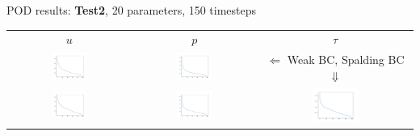 \documentclass[9pt,compress,t,aspectratio=169]{beamer}
\newcommand{\1}{\begin{pmatrix}
		1\\
		1
\end{pmatrix}}
\newcommand{\highlightB}[1]{\textbf{\color{black!15!orangemathlab}#1}}
\begin{document}
\begin{frame}{POD results: \highlightB{Test2}, 20 parameters, 150 timesteps}
	\begin{tabular}{ccc}
		$u$&$p$&$\tau$\\
		\includegraphics[width=0.31\textwidth]{figures/cylinder_turb_weak_eigs_u.pdf}&
		\includegraphics[width=0.31\textwidth]{figures/cylinder_turb_weak_eigs_p.pdf}&
		$\Leftarrow$ Weak BC, Spalding BC $\Downarrow$
		\\
		\includegraphics[width=0.31\textwidth]{figures/cylinder_turb_spalding_eigs_u.pdf}&
		\includegraphics[width=0.31\textwidth]{figures/cylinder_turb_spalding_eigs_p.pdf}&
		\includegraphics[width=0.31\textwidth]{figures/cylinder_turb_spalding_eigs_tau.pdf}
	\end{tabular}\hfill
\end{frame}
\end{document}
